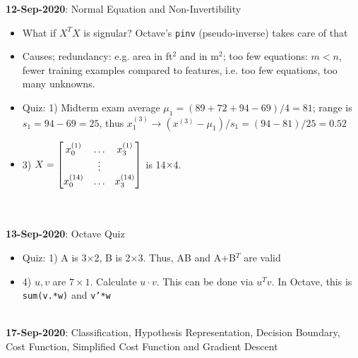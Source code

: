 \documentclass[10pt]{article}
\begin{document}
{\large \textbf{12-Sep-2020}: Normal Equation and Non-Invertibility}
\begin{itemize}
  \item What if $X^TX$ is signular? Octave's \texttt{pinv} (pseudo-inverse) takes care of that
  \item Causes; redundancy: e.g. area in ft$^2$ and in m$^2$; too few equations: $m<n$, fewer training examples compared to features, i.e. too few equations, too many unknowns.
  \item Quiz: 1) Midterm exam average $\mu_1 = (89+72+94-69)/4=81$; range is $s_1= 94-69=25$, thus $x_1^{(3)} \rightarrow (x^{(3)}-\mu_1)/s_1 = (94-81)/25=0.52$
  \item 3) $X = \begin{bmatrix}x_0^{(1)} & \dots & x_3^{(1)} \\ \hfill & \vdots & \hfill \\ x_0^{(14)} & \dots & x_3^{(14)} \end{bmatrix}$ is 14$\times$4.
\end{itemize}
\hfill \\ \hfill \\
{\large \textbf{13-Sep-2020}: Octave Quiz}
\begin{itemize}
  \item Quiz: 1) A is 3$\times$2, B is 2$\times$3. Thus, AB and A+B$^T$ are valid
  \item 4) $u,v$ are $7\times1$. Calculate $u \cdot v$. This can be done via $u^Tv$. In Octave, this is \texttt{sum(v.*w)} and \texttt{v'*w}
\end{itemize}
\hfill \\
{\large \textbf{17-Sep-2020}: Classification, Hypothesis Representation, Decision Boundary, Cost Function, Simplified Cost Function and Gradient Descent}
\end{document}
